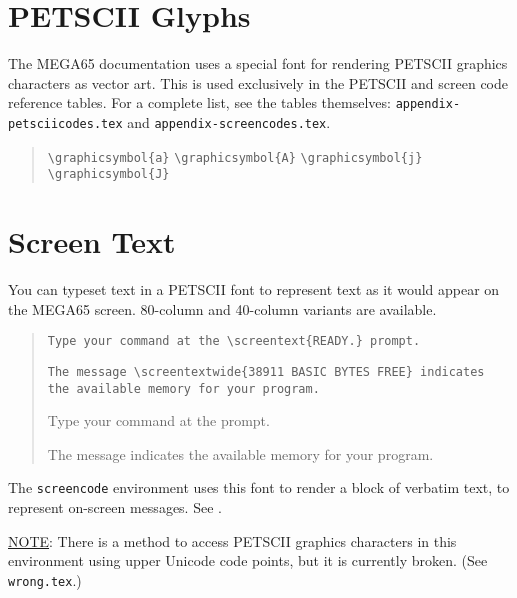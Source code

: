\section{PETSCII Glyphs}

The MEGA65 documentation uses a special font for rendering PETSCII graphics characters as vector art. This is used exclusively in the PETSCII and screen code reference tables. For a complete list, see the tables themselves: \texttt{appendix-petsciicodes.tex} and \texttt{appendix-screencodes.tex}.

\begin{quote}

\texttt{{\textbackslash}graphicsymbol\{a\}}
\texttt{{\textbackslash}graphicsymbol\{A\}}
\texttt{{\textbackslash}graphicsymbol\{j\}}
\texttt{{\textbackslash}graphicsymbol\{J\}}

\hrulefill


\end{quote}

\section{Screen Text}

You can typeset text in a PETSCII font to represent text as it would appear on the MEGA65 screen. 80-column and 40-column variants are available.

\begin{quote}
    \texttt{Type your command at the {\textbackslash}screentext\{READY.\} prompt.}

    \texttt{The message {\textbackslash}screentextwide\{38911 BASIC BYTES FREE\} indicates the available memory for your program.}

    \hrulefill

    Type your command at the  prompt.

    The message  indicates the available memory for your program.

\end{quote}

The \texttt{screencode} environment uses this font to render a block of verbatim text, to represent on-screen messages. See .

\underline{NOTE}: There is a method to access PETSCII graphics characters in this environment using upper Unicode code points, but it is currently broken. (See \texttt{wrong.tex}.)


